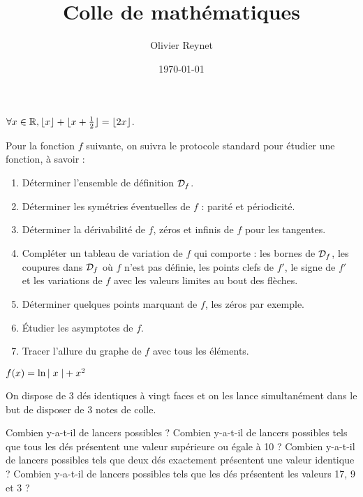 \documentclass[french,12pt,a4paper]{article}
\author{Olivier Reynet}
\title{Colle de mathématiques}
\date{\today}
\begin{document}
\maketitle


\begin{exercise}[subtitle= Partie entière]
	\begin{tasks}
		\task \Mq $\forall x \in \mathbb{R}, \lfloor x \rfloor + \lfloor x + \frac{1}{2} \rfloor = \lfloor 2 x \rfloor$.
	\end{tasks}
\end{exercise}


\begin{exercise}[subtitle= Étude d'une fonction]
	Pour la fonction $f$ suivante, on suivra le protocole standard pour étudier une fonction, à savoir :
	\begin{enumerate}
		\item Déterminer l'ensemble de définition $\mathcal{D}_f$.
		\item Déterminer les symétries éventuelles de $f$ : parité et périodicité.
		\item Déterminer la dérivabilité de $f$,  zéros et infinis de $f$ pour les tangentes.
		\item Compléter un tableau de variation de $f$ qui comporte : les bornes de $\mathcal{D}_f$, les coupures dans $\mathcal{D}_f$ où $f$ n'est pas définie, les points clefs de $f'$, le signe de $f'$ et les variations de $f$ avec les valeurs limites au bout des flèches.
		\item Déterminer quelques points marquant de $f$, les zéros par exemple.
		\item Étudier les asymptotes de $f$.
		\item Tracer l'allure du graphe de $f$ avec tous les éléments.
	\end{enumerate}

	$f(x)= \ln{\mid x \mid}+x^2$

\end{exercise}

	\begin{exercise}[subtitle= Dé à 20 faces]
		On dispose de 3 dés identiques à vingt faces et on les lance simultanément dans le but de disposer de 3 notes de colle. 
		\begin{tasks}
			\task Combien y-a-t-il de lancers possibles ?
			\task Combien y-a-t-il de lancers possibles tels que tous les dés présentent une valeur supérieure ou égale à 10 ?
			\task Combien y-a-t-il de lancers possibles tels que deux dés exactement présentent une valeur identique ? 
			\task Combien y-a-t-il de lancers possibles tels que les dés présentent  les valeurs 17, 9 et 3 ?
		\end{tasks}
	\end{exercise}
\end{document}
